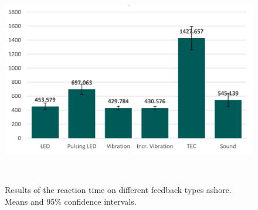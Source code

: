 \begin{figure}
	\includegraphics[width=\columnwidth]{images/ResultsOfReactionTimesUser12.png}
	\caption{Results of the reaction time on different feedback types ashore. Means and 95\% confidence intervals. }~\label{fig:user12}
\end{figure}































